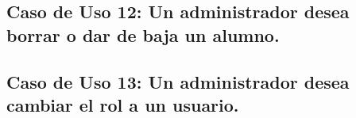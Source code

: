 		\subsection{Caso de Uso 12: Un administrador desea borrar o dar de baja un alumno.}
		\subsection{Caso de Uso 13: Un administrador desea cambiar el rol a un usuario.}
